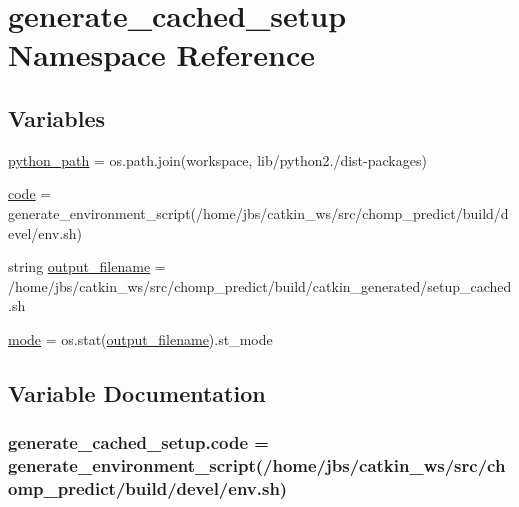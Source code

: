 \hypertarget{namespacegenerate__cached__setup}{}\section{generate\+\_\+cached\+\_\+setup Namespace Reference}
\label{namespacegenerate__cached__setup}
\subsection*{Variables}
\begin{DoxyCompactItemize}
\item 
\hyperlink{namespacegenerate__cached__setup_a72579fd01529a79bab20d99291889d3f}{python\+\_\+path} = os.\+path.\+join(workspace, \textquotesingle{}lib/python2./dist-\/packages\textquotesingle{})
\item 
\hyperlink{namespacegenerate__cached__setup_a52601295006f2366a311c4453d8f2f2e}{code} = generate\+\_\+environment\+\_\+script(\textquotesingle{}/home/jbs/catkin\+\_\+ws/src/chomp\+\_\+predict/build/devel/env.\+sh\textquotesingle{})
\item 
string \hyperlink{namespacegenerate__cached__setup_a0265aee5075ee1eb701ff69c98ad6793}{output\+\_\+filename} = \textquotesingle{}/home/jbs/catkin\+\_\+ws/src/chomp\+\_\+predict/build/catkin\+\_\+generated/setup\+\_\+cached.\+sh\textquotesingle{}
\item 
\hyperlink{namespacegenerate__cached__setup_a10081e5abedae9bd46dd91202096e789}{mode} = os.\+stat(\hyperlink{namespacegenerate__cached__setup_a0265aee5075ee1eb701ff69c98ad6793}{output\+\_\+filename}).st\+\_\+mode
\end{DoxyCompactItemize}


\subsection{Variable Documentation}
\subsubsection[{\texorpdfstring{code}{code}}]{\setlength{\rightskip}{0pt plus 5cm}generate\+\_\+cached\+\_\+setup.\+code = generate\+\_\+environment\+\_\+script(\textquotesingle{}/home/jbs/catkin\+\_\+ws/src/chomp\+\_\+predict/build/devel/env.\+sh\textquotesingle{})}\hypertarget{namespacegenerate__cached__setup_a52601295006f2366a311c4453d8f2f2e}{}\label{namespacegenerate__cached__setup_a52601295006f2366a311c4453d8f2f2e}


